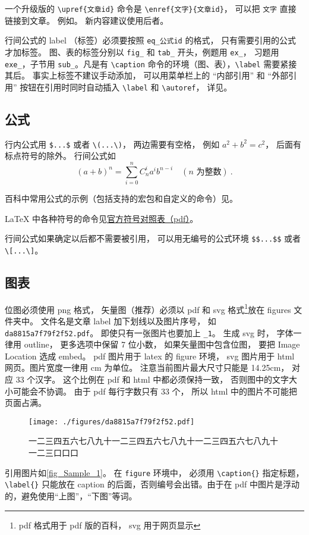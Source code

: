 一个升级版的 \verb`\upref{文章id}` 命令是 \verb`\enref{文字}{文章id}`， 可以把 \verb`文字` 直接链接到文章。 例如。 新内容建议使用后者。

行间公式的 label （标签）必须要按照 \verb|eq_公式id| 的格式， 只有需要引用的公式才加标签。 图、表的标签分别以 \verb|fig_| 和 \verb|tab_| 开头，例题用 \verb|ex_|， 习题用 \verb|exe_|，子节用 \verb`sub_`。凡是有 \verb|\caption| 命令的环境（图、表），\verb|\label| 需要紧接其后。 事实上标签不建议手动添加， 可以用菜单栏上的 “内部引用” 和 “外部引用” 按钮在引用时同时自动插入 \verb|\label| 和 \verb|\autoref|， 详见。

\subsection{公式}
行内公式用 \verb|$...$| 或者 \verb|\(...\)|， 两边需要有空格， 例如 $a^2+b^2=c^2$， 后面有标点符号的除外。 行间公式如
\begin{equation}\label{eq_Sample_1}
(a+b)^n = \sum_{i=0}^n C_n^i a^i b^{n-i} \quad (\text{$n$ 为整数})~.
\end{equation}

百科中常用公式的示例（包括支持的宏包和自定义的命令）见。

LaTeX 中各种符号的命令见\href{https://tug.ctan.org/info/symbols/comprehensive/symbols-a4.pdf}{官方符号对照表（pdf）}。

行间公式如果确定以后都不需要被引用， 可以用无编号的公式环境 \verb|$$...$$| 或者 \verb|\[...\]|。

\subsection{图表}

位图必须使用 png 格式， 矢量图（推荐）必须以 pdf 和 svg 格式\footnote{pdf 格式用于 pdf 版的百科， svg 用于网页显示}放在 figures 文件夹中。 文件名是文章 label 加下划线以及图片序号， 如 \verb|da8815a7f79f2f52.pdf|。 即使只有一张图片也要加上 \verb|_1|。 生成 svg 时， 字体一律用 outline， 更多选项中保留 7 位小数， 如果矢量图中包含位图， 要把 Image Location 选成 embed。 pdf 图片用于 latex 的 figure 环境， svg 图片用于 html 网页。图片宽度一律用 cm 为单位。 注意当前图片最大尺寸只能是 14.25cm， 对应 33 个汉字。 这个比例在 pdf 和 html 中都必须保持一致， 否则图中的文字大小可能会不协调。 由于 pdf 每行字数只有 33 个， 所以 html 中的图片不可能把页面占满。
\begin{figure}[ht]
\centering
\texttt{[image: ./figures/da8815a7f79f2f52.pdf]}
\caption{一二三四五六七八九十一二三四五六七八九十一二三四五六七八九十一二三口口口} \label{fig_Sample_1}
\end{figure}
引用图片如\autoref{fig_Sample_1}。 在 \verb|figure| 环境中， 必须用 \verb|\caption{}| 指定标题， \verb|\label{}| 只能放在 caption 的后面，否则编号会出错。由于在 pdf 中图片是浮动的，避免使用“上图”，“下图”等词。

